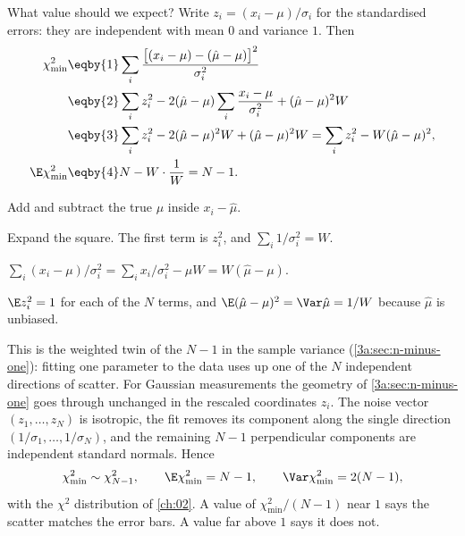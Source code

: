 What value should we expect? Write $z_i=(x_i-\mu)/\sigma_i$ for the
standardised errors: they are independent with mean $0$ and variance $1$.
Then
\begin{align}
  \chi^2_{\min}
  &\eqby{1} \sum_i\frac{\bigl[(x_i-\mu)-(\hat\mu-\mu)\bigr]^2}{\sigma_i^2}\notag\\
  &\eqby{2} \sum_i z_i^2-2(\hat\mu-\mu)\sum_i\frac{x_i-\mu}{\sigma_i^2}+(\hat\mu-\mu)^2W\notag\\
  &\eqby{3} \sum_i z_i^2-2(\hat\mu-\mu)^2W+(\hat\mu-\mu)^2W
   = \sum_i z_i^2-W(\hat\mu-\mu)^2,\notag\\
  \E\chi^2_{\min}
  &\eqby{4} N-W\cdot\frac1W = N-1 .
  \label{3a:eq:wchi2-mean}
\end{align}
\begin{explain}
  \item Add and subtract the true $\mu$ inside $x_i-\hat\mu$.
  \item Expand the square. The first term is $z_i^2$, and $\sum_i1/\sigma_i^2=W$.
  \item $\sum_i(x_i-\mu)/\sigma_i^2=\sum_ix_i/\sigma_i^2-\mu W=W(\hat\mu-\mu)$.
  \item $\E z_i^2=1$ for each of the $N$ terms, and
        $\E(\hat\mu-\mu)^2=\Var\hat\mu=1/W$ because $\hat\mu$ is unbiased.
\end{explain}
This is the weighted twin of the $N-1$ in the sample variance
(\cref{3a:sec:n-minus-one}): fitting one parameter to the data uses up one
of the $N$ independent directions of scatter. For Gaussian measurements the
geometry of \cref{3a:sec:n-minus-one} goes through unchanged in the
rescaled coordinates $z_i$. The noise vector $(z_1,\dots,z_N)$ is
isotropic, the fit removes its component along the single direction
$(1/\sigma_1,\dots,1/\sigma_N)$, and the remaining $N-1$ perpendicular
components are independent standard normals. Hence
\begin{equation}
  \chi^2_{\min}\sim\chi^2_{N-1},\qquad
  \E\chi^2_{\min}=N-1,\qquad \Var\chi^2_{\min}=2(N-1),
  \label{3a:eq:wchi2-dist}
\end{equation}
with the $\chi^2$ distribution of \cref{ch:02}. A value of
$\chi^2_{\min}/(N-1)$ near $1$ says the scatter matches the error bars. A
value far above $1$ says it does not.

